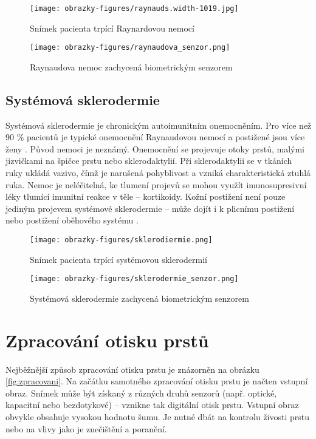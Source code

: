 \begin{figure}[!htbp]
  \begin{minipage}[b]{0.5\linewidth}
    \centering
    \texttt{[image: obrazky-figures/raynauds.width-1019.jpg]}
    \caption{Snímek pacienta trpící Raynardovou nemocí \cite{NHSRaynauds}}
  \end{minipage}
  \hspace{0.5cm}
  \begin{minipage}[b]{0.5\linewidth}
    \centering
    \texttt{[image: obrazky-figures/raynaudova\_senzor.png]}
    \caption{Raynaudova nemoc zachycená biometrickým senzorem \cite{Barotova}}
  \end{minipage}
\end{figure}
\subsection*{Systémová sklerodermie}
Systémová sklerodermie je chronickým autoimunitním onemocněním. Pro více než 90 \% pacientů je typické onemocnění Raynaudovou nemocí a postižené jsou více ženy \cite{InfluenceSkinDiseases}. Původ nemoci je neznámý. Onemocnění se projevuje otoky prstů, malými jizvičkami na špičce prstu nebo sklerodaktylií. Při sklerodaktylii se v tkáních ruky ukládá vazivo, čímž je narušená pohyblivost a vzniká charakteristická ztuhlá ruka. Nemoc je neléčitelná, ke tlumení projevů se mohou využít imunosupresivní léky tlumící imunitní reakce v těle -- kortikoidy. Kožní postižení není pouze jediným projevem systémové sklerodermie -- může dojít i k plicnímu postižení nebo postižení oběhového systému \cite{SystemovaSklerodermie}. 

\begin{figure}[!htbp]
  \begin{minipage}[b]{0.5\linewidth}
    \centering
    \texttt{[image: obrazky-figures/sklerodiermie.png]}
    \caption{Snímek pacienta trpící systémovou sklerodermií \cite{InfluenceSkinDiseases}}
  \end{minipage}
  \hspace{0.5cm}
  \begin{minipage}[b]{0.5\linewidth}
    \centering
    \texttt{[image: obrazky-figures/sklerodermie\_senzor.png]}
    \caption{Systémová sklerodermie zachycená biometrickým senzorem \cite{Barotova}}
  \end{minipage}
\end{figure}

\section{Zpracování otisku prstů}
Nejběžnější způsob zpracování otisku prstu je znázorněn na obrázku \ref{fig:zpracovani}. Na začátku samotného zpracování otisku prstu je načten vstupní obraz. Snímek může být získaný z různých druhů senzorů (např. optické, kapacitní nebo bezdotykové) -- vznikne tak digitální otisk prstu. Vstupní obraz obvykle obsahuje vysokou hodnotu šumu. Je nutné dbát na kontrolu živosti prstu nebo na vlivy jako je znečištění a poranění.

